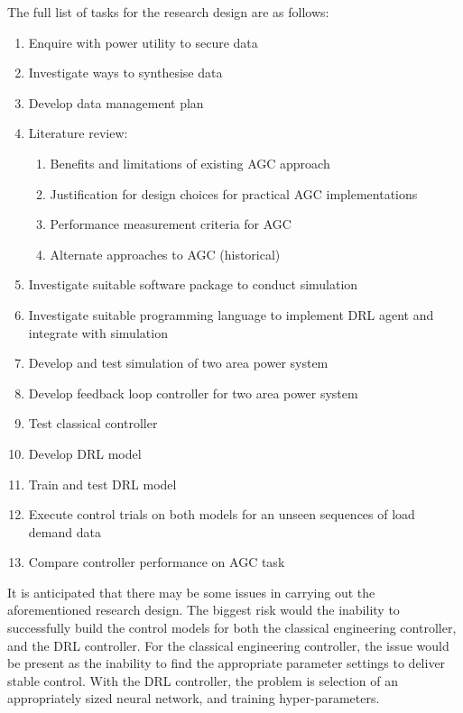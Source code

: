 The full list of tasks for the research design are as follows:
\begin{enumerate}
	\item Enquire with power utility to secure data
	\item Investigate ways to synthesise data
	\item Develop data management plan
	\item Literature review:
	\begin{enumerate}
		\item Benefits and limitations of existing AGC approach
		\item Justification for design choices for practical AGC implementations
		\item Performance measurement criteria for AGC
		\item Alternate approaches to AGC (historical)
	\end{enumerate}
	\item Investigate suitable software package to conduct simulation
	\item Investigate suitable programming language to implement DRL agent and integrate with simulation
	\item Develop and test simulation of two area power system
	\item Develop feedback loop controller for two area power system
	\item Test classical controller
	\item Develop DRL model
	\item Train and test DRL model
	\item Execute control trials on both models for an unseen sequences of load demand data
	\item Compare controller performance on AGC task
\end{enumerate}

It is anticipated that there may be some issues in carrying out the aforementioned research design. The biggest risk would the inability to successfully build the control models for both the classical engineering controller, and the DRL controller. For the classical engineering controller, the issue would be present as the inability to find the appropriate parameter settings to deliver stable control. With the DRL controller, the problem is selection of an appropriately sized neural network, and training hyper-parameters.